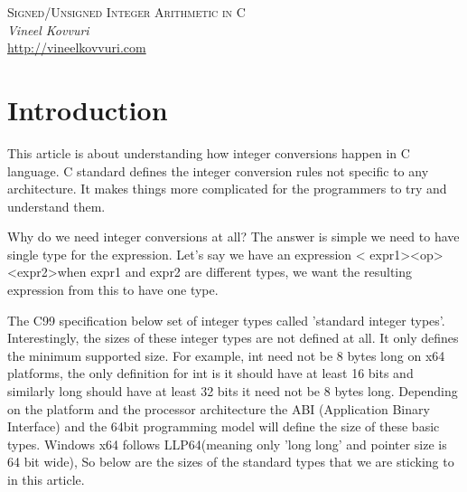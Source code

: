 \documentclass{article}
\begin{document}
\begin{titlepage}
   \begin{center}
      \Large\textsc{Signed/Unsigned Integer Arithmetic in C}\\
      \vspace{5mm}
      \Large\textit{Vineel Kovvuri}\\
      \url{http://vineelkovvuri.com}\\
   \end{center}
\end{titlepage}

\tableofcontents

\newpage
\section{Introduction}
This article is about understanding how integer conversions happen in C
language. C standard defines the integer conversion rules not specific to any
architecture. It makes things more complicated for the programmers to try and
understand them.

Why do we need integer conversions at all? The answer is simple we need to have
single type for the expression. Let's say we have an expression \textless
expr1\textgreater \textless op\textgreater \textless expr2\textgreater  when
expr1 and expr2 are different types, we want the resulting expression from this
to have one type.

The C99 specification below set of integer types called 'standard integer
types'. Interestingly, the sizes of these integer types are not defined at all.
It only defines the minimum supported size. For example, int need not be 8 bytes
long on x64 platforms, the only definition for int is it should have at least 16
bits and similarly long should have at least 32 bits it need not be 8 bytes
long. Depending on the platform and the processor architecture the ABI
(Application Binary Interface) and the 64bit programming model will define the
size of these basic types. Windows x64 follows LLP64(meaning only 'long long'
and pointer size is 64 bit wide), So below are the sizes of the standard types
that we are sticking to in this article.
\end{document}
